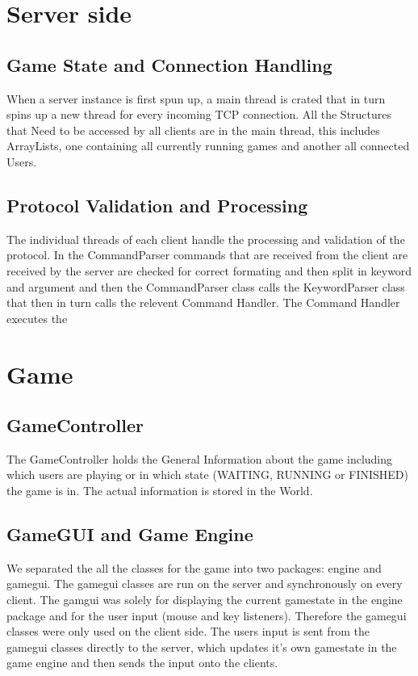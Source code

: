 \documentclass[11pt,a4paper]{article}
\begin{document}
		\subsection{}
	\section{Server side}
		\subsection{Game State and Connection Handling}
		When a server instance is first spun up, a main thread is crated that in turn spins up a new thread for every incoming TCP connection. All the Structures that Need to be accessed by all clients are in the main thread, this includes ArrayLists, one containing all currently running games and another all connected Users.
		\subsection{Protocol Validation and Processing}
		The individual threads of each client handle the processing and validation of the protocol. In the CommandParser commands that are received from the client are received by the server are checked for correct formating and then split in keyword and argument and then the CommandParser class calls the KeywordParser class that then in turn calls the relevent Command Handler. The Command Handler executes the  
		\subsection{}
	\section{Game}
		\subsection{GameController}
		The GameController holds the General Information about the game including which users are playing or in which state (WAITING, RUNNING or FINISHED) the game is in. The actual information is stored in the World.
		\subsection{GameGUI and Game Engine}
		We separated the all the classes for the game into two packages: engine and gamegui. The gamegui classes are run on the server and synchronously on every client. The gamgui was solely for displaying the current gamestate in the engine package and for the user input (mouse and key listeners). Therefore the gamegui classes were only used on the client side. The users input is sent from the gamegui classes directly to the server, which updates it's own gamestate in the game engine and then sends the input onto the clients.
\end{document}
